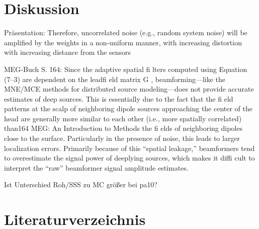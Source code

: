 \documentclass[doc,a4paper,12pt]{apa6}
\begin{document}
\section{Diskussion}
\label{sec:diskussion}

Präsentation: Therefore, uncorrelated noise (e.g., random system noise) will be amplified by the weights in a non-uniform manner, with increasing distortion with increasing distance from the sensors 

MEG-Buch S. 164: Since the adaptive spatial fi lters computed using Equation (7–3) are dependent on the leadfi eld matrix G , beamforming—like the MNE/MCE methods for distributed source modeling—does not provide accurate estimates of deep sources. This is essentially due to the fact that the fi eld patterns at the scalp of neighboring dipole sources approaching the center of the head are generally more similar to each other (i.e., more spatially correlated) than164
MEG: An Introduction to Methods the fi elds of neighboring dipoles close to the surface. Particularly in the presence of noise, this leads to larger localization errors. Primarily because of this “spatial leakage,” beamformers tend to overestimate the signal power of deeplying sources, which makes it diffi cult to interpret the “raw” beamformer signal amplitude estimates.

Ist Unterschied Roh/SSS zu MC größer bei pa10?

\newpage
\section{Literaturverzeichnis}

\printbibliography[heading=none]

%
\end{document}
